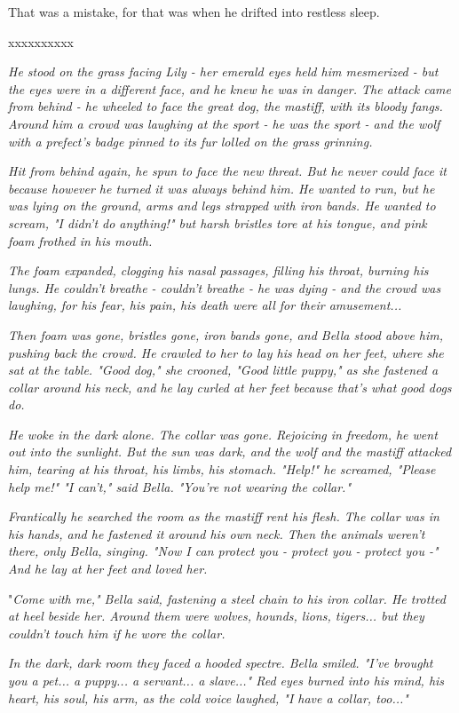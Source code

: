 \documentclass[a4paper,11pt]{article}
\begin{document}
That was a mistake, for that was when he drifted into restless sleep.

xxxxxxxxxx

\emph{He stood on the grass facing Lily - her emerald eyes held him mesmerized - but the eyes were in a different face, and he knew he was in danger. The attack came from behind - he wheeled to face the great dog, the mastiff, with its bloody fangs. Around him a crowd was laughing at the sport - he was the sport - and the wolf with a prefect's badge pinned to its fur lolled on the grass grinning.}

\emph{Hit from behind again, he spun to face the new threat. But he never could face it because however he turned it was always behind him. He wanted to run, but he was lying on the ground, arms and legs strapped with iron bands. He wanted to scream, "I didn't do anything!" but harsh bristles tore at his tongue, and pink foam frothed in his mouth.}

\emph{The foam expanded, clogging his nasal passages, filling his throat, burning his lungs. He couldn't breathe - couldn't breathe - he was dying - and the crowd was laughing, for his fear, his pain, his death were all for their amusement...}

\emph{Then foam was gone, bristles gone, iron bands gone, and Bella stood above him, pushing back the crowd. He crawled to her to lay his head on her feet, where she sat at the table. "Good dog," she crooned, "Good little puppy," as she fastened a collar around his neck, and he lay curled at her feet because that's what good dogs do.}

\emph{He woke in the dark alone. The collar was gone. Rejoicing in freedom, he went out into the sunlight. But the sun was dark, and the wolf and the mastiff attacked him, tearing at his throat, his limbs, his stomach. "Help!" he screamed, "Please help me!" "I can't," said Bella. "You're not wearing the collar."}

\emph{Frantically he searched the room as the mastiff rent his flesh. The collar was in his hands, and he fastened it around his own neck. Then the animals weren't there, only Bella, singing. "Now I can protect you - protect you - protect you -" And he lay at her feet and loved her.}

"\emph{Come with me," Bella said, fastening a steel chain to his iron collar. He trotted at heel beside her. Around them were wolves, hounds, lions, tigers... but they couldn't touch him if he wore the collar.}

\emph{In the dark, dark room they faced a hooded spectre. Bella smiled. "I've brought you a pet... a puppy... a servant... a slave..." Red eyes burned into his mind, his heart, his soul, his arm, as the cold voice laughed, "I have a collar, too..."}
\end{document}
